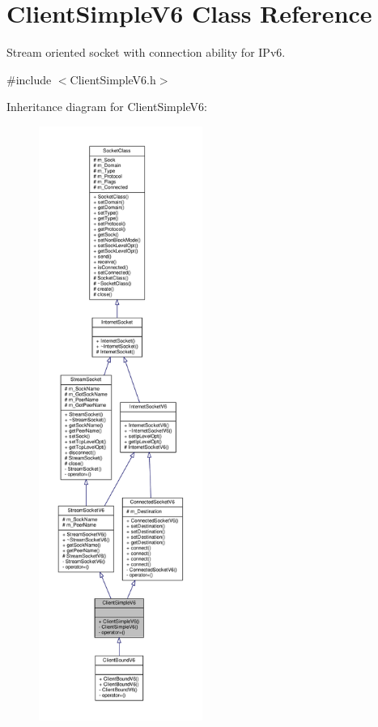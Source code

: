 \hypertarget{classClientSimpleV6}{}\section{Client\+Simple\+V6 Class Reference}
\label{classClientSimpleV6}


Stream oriented socket with connection ability for I\+Pv6.  




{\ttfamily \#include $<$Client\+Simple\+V6.\+h$>$}



Inheritance diagram for Client\+Simple\+V6\+:\nopagebreak
\begin{figure}[H]
\begin{center}
\leavevmode
\includegraphics[height=550pt]{classClientSimpleV6__inherit__graph}
\end{center}
\end{figure}
